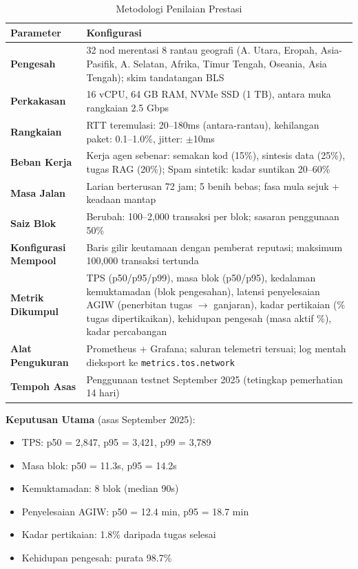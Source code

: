 \documentclass[11pt]{article}
\begin{document}
\begin{table}[H]
\centering
\caption{Metodologi Penilaian Prestasi}
\label{tab:evaluation-methodology}
\begin{tabular}{@{}p{}p{}@{}}
\toprule
\textbf{Parameter} & \textbf{Konfigurasi} \\ \midrule
\textbf{Pengesah} & 32 nod merentasi 8 rantau geografi (A. Utara, Eropah, Asia-Pasifik, A. Selatan, Afrika, Timur Tengah, Oseania, Asia Tengah); skim tandatangan BLS \\
\textbf{Perkakasan} & 16 vCPU, 64 GB RAM, NVMe SSD (1 TB), antara muka rangkaian 2.5 Gbps \\
\textbf{Rangkaian} & RTT teremulasi: 20--180ms (antara-rantau), kehilangan paket: 0.1--1.0\%, jitter: $\pm$10ms \\
\textbf{Beban Kerja} & Kerja agen sebenar: semakan kod (15\%), sintesis data (25\%), tugas RAG (20\%); Spam sintetik: kadar suntikan 20--60\% \\
\textbf{Masa Jalan} & Larian berterusan 72 jam; 5 benih bebas; fasa mula sejuk + keadaan mantap \\
\textbf{Saiz Blok} & Berubah: 100--2,000 transaksi per blok; sasaran penggunaan 50\% \\
\textbf{Konfigurasi Mempool} & Baris gilir keutamaan dengan pemberat reputasi; maksimum 100,000 transaksi tertunda \\
\textbf{Metrik Dikumpul} & TPS (p50/p95/p99), masa blok (p50/p95), kedalaman kemuktamadan (blok pengesahan), latensi penyelesaian AGIW (penerbitan tugas $\rightarrow$ ganjaran), kadar pertikaian (\% tugas dipertikaikan), kehidupan pengesah (masa aktif \%), kadar percabangan \\
\textbf{Alat Pengukuran} & Prometheus + Grafana; saluran telemetri tersuai; log mentah dieksport ke \texttt{metrics.tos.network} \\
\textbf{Tempoh Asas} & Penggunaan testnet September 2025 (tetingkap pemerhatian 14 hari) \\
\bottomrule
\end{tabular}
\end{table}

\textbf{Keputusan Utama} (asas September 2025):
\begin{itemize}[noitemsep]
  \item TPS: p50 = 2,847, p95 = 3,421, p99 = 3,789
  \item Masa blok: p50 = 11.3s, p95 = 14.2s
  \item Kemuktamadan: 8 blok (median 90s)
  \item Penyelesaian AGIW: p50 = 12.4 min, p95 = 18.7 min
  \item Kadar pertikaian: 1.8\% daripada tugas selesai
  \item Kehidupan pengesah: purata 98.7\%
\end{itemize}
\end{document}
